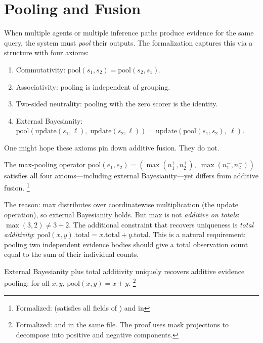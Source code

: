 \documentclass[11pt,openany]{report}
\begin{document}
\section{Pooling and Fusion}
\label{sec:pooling}

When multiple agents or multiple inference paths produce evidence
for the same query, the system must \emph{pool} their outputs.
The formalization captures this via a 
structure with four axioms:
\begin{enumerate}
\item Commutativity: $\mathrm{pool}(s_1, s_2) = \mathrm{pool}(s_2, s_1)$.
\item Associativity: pooling is independent of grouping.
\item Two-sided neutrality: pooling with the zero scorer is the
  identity.
\item External Bayesianity:
  $\mathrm{pool}(\mathrm{update}(s_1, \ell),\;
  \mathrm{update}(s_2, \ell)) =
  \mathrm{update}(\mathrm{pool}(s_1, s_2),\; \ell)$.
\end{enumerate}

\noindent
One might hope these axioms pin down additive fusion.  They do not.

\begin{theorem}
\label{thm:pooling-non-unique}
The max-pooling operator
$\mathrm{pool}(e_1, e_2) = (\max(n_1^+, n_2^+),\; \max(n_1^-, n_2^-))$
satisfies all four axioms---including external
Bayesianity---yet differs from additive fusion.%
\footnote{Formalized:
 (satisfies all fields of
) and
 in
}
\end{theorem}

\noindent
The reason: max distributes over coordinatewise multiplication
(the update operation), so external Bayesianity holds.  But max is
not \emph{additive on totals}: $\max(3, 2) \ne 3 + 2$.  The
additional constraint that recovers uniqueness is
\emph{total additivity}:
$\mathrm{pool}(x, y).\mathrm{total} =
x.\mathrm{total} + y.\mathrm{total}$.
This is a natural requirement: pooling two independent evidence
bodies should give a total observation count equal to the sum of
their individual counts.

\begin{theorem}
\label{thm:pooling-unique}
External Bayesianity plus total additivity uniquely recovers
additive evidence pooling: for all $x, y$,
$\mathrm{pool}(x, y) = x + y$.%
\footnote{Formalized:
 and
in the same file.  The proof uses mask projections to decompose
into positive and negative components.}
\end{theorem}
\end{document}
